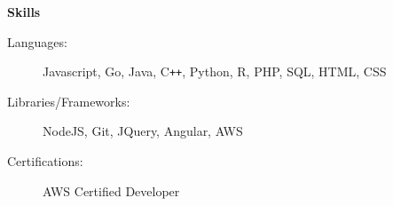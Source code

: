 \documentclass[letterpaper,11pt]{article}
\newcommand{\resheading}[1]{{\large \colorbox{mygrey}{\begin{minipage}{\textwidth}{\textbf{#1 \vphantom{p\^{E}}}}\end{minipage}}}}
\begin{document}
\resheading{Skills}

\begin{description}
\item[Languages:]
Javascript, Go, Java, C{}\verb!++!, Python, R, PHP, SQL, HTML, CSS
\item[Libraries/Frameworks:]
NodeJS, Git, JQuery, Angular,  AWS
\item[Certifications:]
AWS Certified Developer

\end{description}
\end{document}
